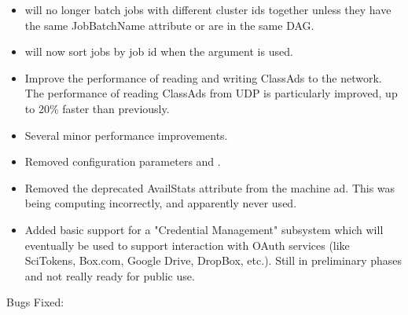 \begin{itemize}
\item {} will no longer batch jobs with different cluster ids together unless they
have the same JobBatchName attribute or are in the same DAG.

\item {} will now sort jobs by job id when the  argument is used.

\item Improve the performance of reading and writing ClassAds to the network.
The performance of reading ClassAds from UDP is particularly improved, up
to 20\% faster than previously.

\item Several minor performance improvements.

\item Removed configuration parameters 
and .

\item Removed the deprecated AvailStats attribute from the machine ad. This
was being computing incorrectly, and apparently never used.

\item Added basic support for a "Credential Management" subsystem which will
eventually be used to support interaction with OAuth services (like SciTokens,
Box.com, Google Drive, DropBox, etc.).  Still in preliminary phases and not
really ready for public use.

\end{itemize}

\noindent Bugs Fixed:

